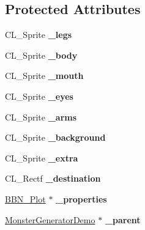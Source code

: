 \subsection*{Protected Attributes}
\begin{DoxyCompactItemize}
\item 
\hypertarget{classMonster_a74d6adb21c6a59f1444f52f8645d186b}{
CL\_\-Sprite {\bfseries \_\-legs}}
\label{classMonster_a74d6adb21c6a59f1444f52f8645d186b}

\item 
\hypertarget{classMonster_aedc760e23fe73e5f6e4936cf23639b8c}{
CL\_\-Sprite {\bfseries \_\-body}}
\label{classMonster_aedc760e23fe73e5f6e4936cf23639b8c}

\item 
\hypertarget{classMonster_aad50e8f3e9c8ec0f4b236796e474092f}{
CL\_\-Sprite {\bfseries \_\-mouth}}
\label{classMonster_aad50e8f3e9c8ec0f4b236796e474092f}

\item 
\hypertarget{classMonster_aa21f28b1d669df2750b0ac8cac4b1d3a}{
CL\_\-Sprite {\bfseries \_\-eyes}}
\label{classMonster_aa21f28b1d669df2750b0ac8cac4b1d3a}

\item 
\hypertarget{classMonster_ae74ed89492b52a6bc2b7eceb91f68b33}{
CL\_\-Sprite {\bfseries \_\-arms}}
\label{classMonster_ae74ed89492b52a6bc2b7eceb91f68b33}

\item 
\hypertarget{classMonster_af7d855b6b8b4967751381ebc36a78619}{
CL\_\-Sprite {\bfseries \_\-background}}
\label{classMonster_af7d855b6b8b4967751381ebc36a78619}

\item 
\hypertarget{classMonster_af888771b6f7e506b206cdf7c0684d6e3}{
CL\_\-Sprite {\bfseries \_\-extra}}
\label{classMonster_af888771b6f7e506b206cdf7c0684d6e3}

\item 
\hypertarget{classMonster_a9081e7e2f5dcc47012c4a03d14c1d921}{
CL\_\-Rectf {\bfseries \_\-destination}}
\label{classMonster_a9081e7e2f5dcc47012c4a03d14c1d921}

\item 
\hypertarget{classMonster_a31e59d9fe5c537980856149cce2d47da}{
\hyperlink{classBBN__Plot}{BBN\_\-Plot} $\ast$ {\bfseries \_\-properties}}
\label{classMonster_a31e59d9fe5c537980856149cce2d47da}

\item 
\hypertarget{classMonster_a3213f8da9db9f30ac68a73fa89e82569}{
\hyperlink{classMonsterGeneratorDemo}{MonsterGeneratorDemo} $\ast$ {\bfseries \_\-parent}}
\label{classMonster_a3213f8da9db9f30ac68a73fa89e82569}

\end{DoxyCompactItemize}


